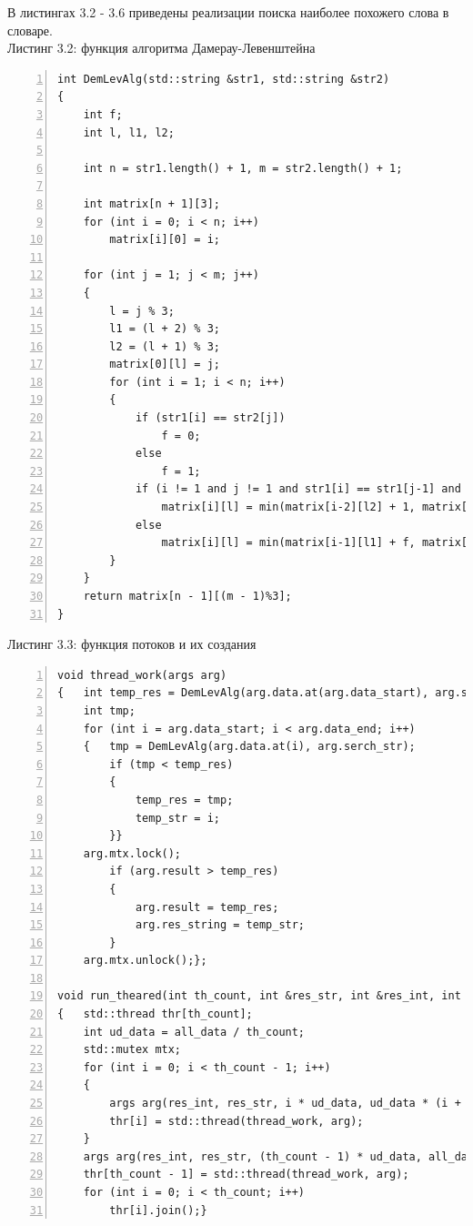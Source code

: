 \documentclass[12pt,a4paper]{report}
\begin{document}
В листингах 3.2 - 3.6 приведены реализации поиска наиболее похожего слова в словаре. \\
\newpage
\textrm{Листинг 3.2: функция алгоритма Дамерау-Левенштейна}
\begin{lstlisting}[frame=single, numbers=left]
int DemLevAlg(std::string &str1, std::string &str2)
{
    int f;
    int l, l1, l2;

    int n = str1.length() + 1, m = str2.length() + 1;

    int matrix[n + 1][3];
    for (int i = 0; i < n; i++)
        matrix[i][0] = i;

    for (int j = 1; j < m; j++)
    {
        l = j % 3;
        l1 = (l + 2) % 3;
        l2 = (l + 1) % 3;
        matrix[0][l] = j;
        for (int i = 1; i < n; i++)
        {
            if (str1[i] == str2[j])
                f = 0;
            else
                f = 1;
            if (i != 1 and j != 1 and str1[i] == str1[j-1] and str2[j] == str1[i-1])
                matrix[i][l] = min(matrix[i-2][l2] + 1, matrix[i-1][l1] + f, matrix[i-1][l] + 1, matrix[i][l1] + 1);
            else
                matrix[i][l] = min(matrix[i-1][l1] + f, matrix[i-1][l] + 1, matrix[i][l1] + 1);
        }
    }
    return matrix[n - 1][(m - 1)%3];
}
\end{lstlisting}
\newpage
\textrm{Листинг 3.3: функция потоков и их создания}
\begin{lstlisting}[frame=single, numbers=left]
void thread_work(args arg)
{	int temp_res = DemLevAlg(arg.data.at(arg.data_start), arg.serch_str), temp_str = arg.data_start;
    int tmp;
    for (int i = arg.data_start; i < arg.data_end; i++)
    {	tmp = DemLevAlg(arg.data.at(i), arg.serch_str);
        if (tmp < temp_res)
        {
            temp_res = tmp;
            temp_str = i;
        }}
    arg.mtx.lock();
        if (arg.result > temp_res)
        {
            arg.result = temp_res;
            arg.res_string = temp_str;
        }
    arg.mtx.unlock();};
    
void run_theared(int th_count, int &res_str, int &res_int, int all_data, std::vector <std::string> &data, std::string &search)
{	std::thread thr[th_count];
    int ud_data = all_data / th_count;
    std::mutex mtx;
    for (int i = 0; i < th_count - 1; i++)
    {
        args arg(res_int, res_str, i * ud_data, ud_data * (i + 1), data, search, mtx);
        thr[i] = std::thread(thread_work, arg);
    }
    args arg(res_int, res_str, (th_count - 1) * ud_data, all_data, data, search, mtx);
    thr[th_count - 1] = std::thread(thread_work, arg);
    for (int i = 0; i < th_count; i++)
        thr[i].join();}
\end{lstlisting}
\end{document}

